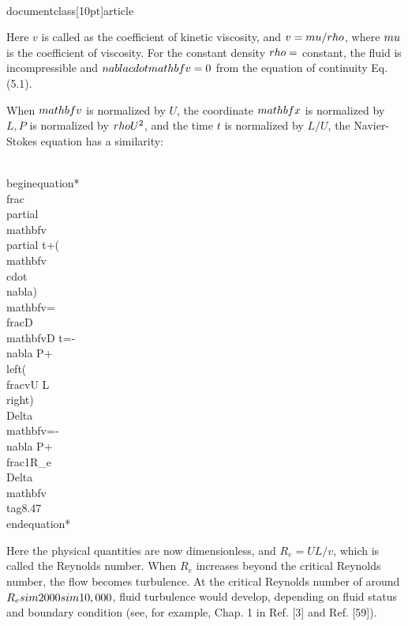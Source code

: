 \\documentclass[10pt]{article}
\begin{document}
{{{{{Here $v$ is called as the coefficient of kinetic viscosity, and $v=\\mu / \\rho$, where $\\mu$ is the coefficient of viscosity. For the constant density $\\rho=$ constant, the fluid is incompressible and $\\nabla \\cdot \\mathbf{v}=0$ from the equation of continuity Eq. (5.1).

When $\\mathbf{v}$ is normalized by $U$, the coordinate $\\mathbf{x}$ is normalized by $L, P$ is normalized by $\\rho U^{2}$, and the time $t$ is normalized by $L / U$, the Navier-Stokes equation has a similarity:


\\begin{equation*}
\\frac{\\partial \\mathbf{v}}{\\partial t}+(\\mathbf{v} \\cdot \\nabla) \\mathbf{v}=\\frac{D \\mathbf{v}}{D t}=-\\nabla P+\\left(\\frac{v}{U L}\\right) \\Delta \\mathbf{v}=-\\nabla P+\\frac{1}{R_{e}} \\Delta \\mathbf{v} \\tag{8.47}
\\end{equation*}


Here the physical quantities are now dimensionless, and $R_{e}=U L / v$, which is called the Reynolds number. When $R_{e}$ increases beyond the critical Reynolds number, the flow becomes turbulence. At the critical Reynolds number of around $R_{e} \\sim 2000 \\sim 10,000$, fluid turbulence would develop, depending on fluid status and boundary condition (see, for example, Chap. 1 in Ref. [3] and Ref. [59]).

}}}}}
\end{document}
